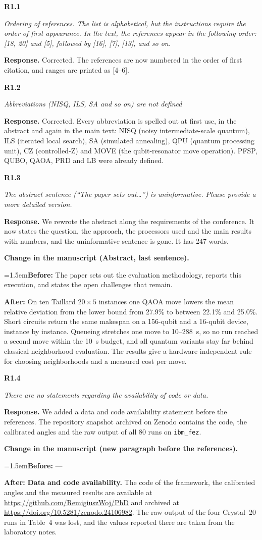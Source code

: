 \documentclass[11pt]{article}
\newenvironment{rc}[1]{\par\medskip\noindent\textbf{#1}\par\nopagebreak\noindent\itshape\ignorespaces}{\par}
\newcommand{\answer}[1]{\par\smallskip\noindent\textbf{Response.} #1\par}
\newcommand{\change}[3]{\par\smallskip\noindent\textbf{Change in the manuscript (#1).}\par
  {\leftskip=1.5em\noindent\textbf{Before:} #2\par\noindent\textbf{After:} #3\par}}
\begin{document}
\begin{rc}{R1.1}
Ordering of references. The list is alphabetical, but the instructions require the order of first appearance. In the text, the references appear in the following order: [18, 20] and [5], followed by [16], [7], [13], and so on.
\end{rc}
\answer{Corrected. The references are now numbered in the order of first citation, and ranges are printed as [4--6].}

\begin{rc}{R1.2}
Abbreviations (NISQ, ILS, SA and so on) are not defined
\end{rc}
\answer{Corrected. Every abbreviation is spelled out at first use, in the abstract and again in the main text: NISQ (noisy intermediate-scale quantum), ILS (iterated local search), SA (simulated annealing), QPU (quantum processing unit), CZ (controlled-Z) and MOVE (the qubit-resonator move operation). PFSP, QUBO, QAOA, PRD and LB were already defined.}

\begin{rc}{R1.3}
The abstract sentence (``The paper sets out\ldots'') is uninformative. Please provide a more detailed version.
\end{rc}
\answer{We rewrote the abstract along the requirements of the conference. It now states the question, the approach, the processors used and the main results with numbers, and the uninformative sentence is gone. It has 247 words.}
\change{Abstract, last sentence}{The paper sets out the evaluation methodology, reports this execution, and states the open challenges that remain.}{On ten Taillard $20\times5$ instances one QAOA move lowers the mean relative deviation from the lower bound from 27.9\% to between 22.1\% and 25.0\%. Short circuits return the same makespan on a 156-qubit and a 16-qubit device, instance by instance. Queueing stretches one move to 10--288~s, so no run reached a second move within the 10~s budget, and all quantum variants stay far behind classical neighborhood evaluation. The results give a hardware-independent rule for choosing neighborhoods and a measured cost per move.}

\begin{rc}{R1.4}
There are no statements regarding the availability of code or data.
\end{rc}
\answer{We added a data and code availability statement before the references. The repository snapshot archived on Zenodo contains the code, the calibrated angles and the raw output of all 80 runs on \texttt{ibm\_fez}.}
\change{new paragraph before the references}{---}{\textbf{Data and code availability.} The code of the framework, the calibrated angles and the measured results are available at \url{https://github.com/RemigiuszWoj/PhD} and archived at \url{https://doi.org/10.5281/zenodo.24106982}. The raw output of the four Crystal~20 runs in Table~4 was lost, and the values reported there are taken from the laboratory notes.}
\end{document}
